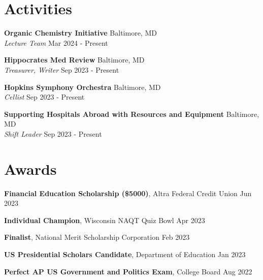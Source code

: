 \documentclass[11pt]{article}       %
\begin{document}
\vspace{-18.5pt}

\section*{Activities}
\textbf{Organic Chemistry Initiative} \hfill Baltimore, MD \\
\textit{Lecture Team} \hfill Mar 2024 - Present \\

\vspace{5pt}

\textbf{Hippocrates Med Review} \hfill Baltimore, MD \\
\textit{Treasurer, Writer} \hfill Sep 2023 - Present \\

\vspace{5pt}

\textbf{Hopkins Symphony Orchestra} \hfill Baltimore, MD \\
\textit{Cellist} \hfill Sep 2023 - Present \\

\vspace{5pt}

\textbf{Supporting Hospitals Abroad with Resources and Equipment} \hfill Baltimore, MD \\
\textit{Shift Leader} \hfill Sep 2023 - Present \\

\vspace{-9pt}

\section*{Awards}
\textbf{Financial Education Scholarship (\$5000)}, Altra Federal Credit Union \hfill Jun 2023 \\

\vspace{5pt}

\textbf{Individual Champion}, Wisconsin NAQT Quiz Bowl \hfill Apr 2023 \\

\vspace{5pt}

\textbf{Finalist}, National Merit Scholarship Corporation \hfill Feb 2023 \\

\vspace{5pt}

\textbf{US Presidential Scholars Candidate}, Department of Education \hfill Jan 2023 \\

\vspace{5pt}

\textbf{Perfect AP US Government and Politics Exam}, College Board \hfill Aug 2022
\end{document}
